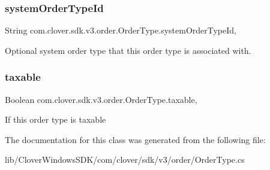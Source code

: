 \subsubsection{\texorpdfstring{system\+Order\+Type\+Id}{systemOrderTypeId}}
{\footnotesize\ttfamily String com.\+clover.\+sdk.\+v3.\+order.\+Order\+Type.\+system\+Order\+Type\+Id\hspace{0.3cm}{\ttfamily [get]}, {\ttfamily [set]}}



Optional system order type that this order type is associated with. 

\mbox{\label{classcom_1_1clover_1_1sdk_1_1v3_1_1order_1_1_order_type_ae54a438e3bdd8b0a7b211a9e022b64f8}} 
\subsubsection{\texorpdfstring{taxable}{taxable}}
{\footnotesize\ttfamily Boolean com.\+clover.\+sdk.\+v3.\+order.\+Order\+Type.\+taxable\hspace{0.3cm}{\ttfamily [get]}, {\ttfamily [set]}}



If this order type is taxable 



The documentation for this class was generated from the following file\+:\begin{DoxyCompactItemize}
\item 
lib/\+Clover\+Windows\+S\+D\+K/com/clover/sdk/v3/order/Order\+Type.\+cs\end{DoxyCompactItemize}
